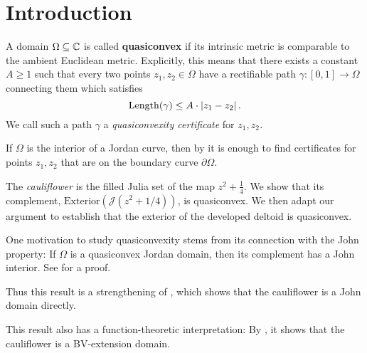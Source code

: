 


\section{Introduction}
A domain $\Omega\subseteq\mathbb{C}$ is called \textbf{quasiconvex }if its
intrinsic metric is comparable to the ambient Euclidean metric. Explicitly,
this means that there exists a constant $A\geq1$ such that every
two points $z_{1},z_{2}\in\Omega$ have a rectifiable path $\gamma:\left[0,1\right]\to\Omega$
connecting them which satisfies
\[
\operatorname{Length}(\gamma)\leq A\cdot\left|z_{1}-z_{2}\right|.
\]
We call such a path $\gamma$ a \emph{quasiconvexity certificate }for\emph{
$z_{1},z_{2}$.}

If $\Omega$ is the interior of a Jordan curve, then by \cite[Corollary F]{hakobyan_euclidean_2008}
it is enough to find certificates for points $z_{1},z_{2}$ that are
on the boundary curve $\partial\Omega$.%
\begin{comment}
It is also shown in \cite{hakobyan_euclidean_2008} that any quasidisk is quasiconvex.
\end{comment}

The \emph{cauliflower} is the filled Julia set of the map $z^2+\frac 14$.
We show that its complement, $\mathrm{Exterior}(\mathcal{J}(z^{2}+1/4))$,
is quasiconvex. We then adapt our argument to establish that the exterior of the developed deltoid is quasiconvex.



One motivation to study quasiconvexity stems from its connection with the
John property: If $\Omega$ is a quasiconvex Jordan domain, then its complement has a John interior. See \cite[Corollary 3.4]{hakobyan_euclidean_2008} for a proof.

Thus this result is a strengthening of \cite[Theorem 6.1]{carleson_julia_1994}, which shows that the cauliflower is a John domain directly.

This result also has a function-theoretic interpretation: By \cite[Theorem 1.1]{koskela_geometric_2010}, it shows that the cauliflower is a BV-extension domain.

\begin{comment}
The Filled Julia set of $z^{2}+1/4$, called the cauliflower, has
an inward-pointing cusp and hence is not quasiconvex.
\end{comment}

